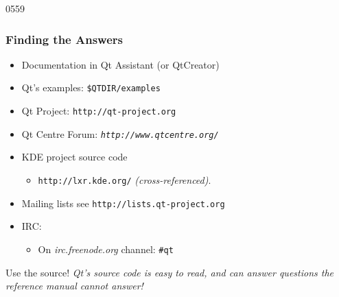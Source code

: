 \begin{slide}[fragile]{0559}
  \frametitle{Finding the Answers}\label{findingTheAnswer}
  \begin{itemize}
  \item Documentation in Qt Assistant (or QtCreator)
  \item Qt's examples:  \texttt{\$QTDIR/examples}
    \item Qt Project: \texttt{http://qt-project.org}
 \item Qt Centre Forum: \textit{\texttt{http://www.qtcentre.org/}}
  \item KDE project source code
    \begin{itemize}
    \item \texttt{http://lxr.kde.org/} \textit{(cross-referenced)}.
    \end{itemize}
  \item Mailing lists see \texttt{http://lists.qt-project.org}
  \item IRC: 
    \begin{itemize}
    \item On \textit{irc.freenode.org} channel: \texttt{\#qt}
    \end{itemize}
  \end{itemize}
   \begin{block}{Use the source!}
    \textit{Qt's source code is easy to read, and can answer
      questions the reference manual cannot answer!} 
   \end{block}
\end{slide}
